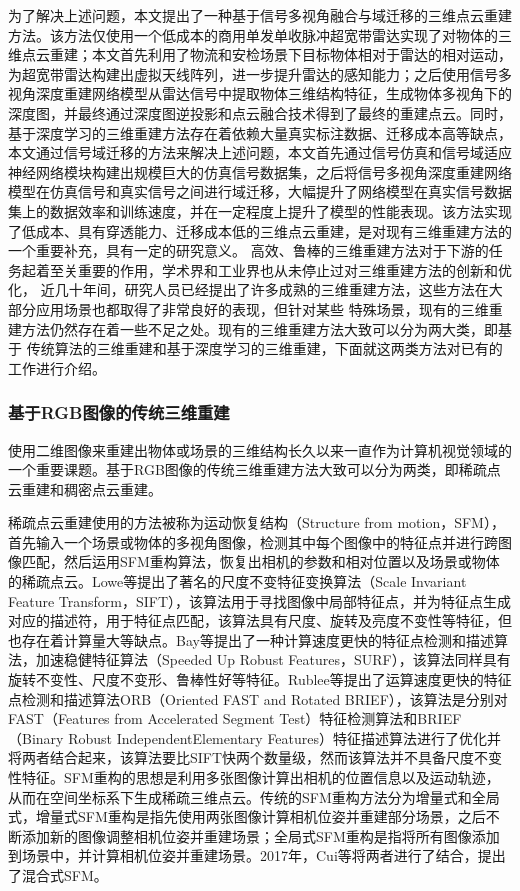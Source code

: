 为了解决上述问题，本文提出了一种基于信号多视角融合与域迁移的三维点云重建方法。该方法仅使用一个低成本的商用单发单收脉冲超宽带雷达实现了对物体的三维点云重建；本文首先利用了物流和安检场景下目标物体相对于雷达的相对运动，为超宽带雷达构建出虚拟天线阵列，进一步提升雷达的感知能力；之后使用信号多视角深度重建网络模型从雷达信号中提取物体三维结构特征，生成物体多视角下的深度图，并最终通过深度图逆投影和点云融合技术得到了最终的重建点云。同时，基于深度学习的三维重建方法存在着依赖大量真实标注数据、迁移成本高等缺点，本文通过信号域迁移的方法来解决上述问题，本文首先通过信号仿真和信号域适应神经网络模块构建出规模巨大的仿真信号数据集，之后将信号多视角深度重建网络模型在仿真信号和真实信号之间进行域迁移，大幅提升了网络模型在真实信号数据集上的数据效率和训练速度，并在一定程度上提升了模型的性能表现。该方法实现了低成本、具有穿透能力、迁移成本低的三维点云重建，是对现有三维重建方法的一个重要补充，具有一定的研究意义。
高效、鲁棒的三维重建方法对于下游的任务起着至关重要的作用，学术界和工业界也从未停止过对三维重建方法的创新和优化，
近几十年间，研究人员已经提出了许多成熟的三维重建方法，这些方法在大部分应用场景也都取得了非常良好的表现，但针对某些
特殊场景，现有的三维重建方法仍然存在着一些不足之处。现有的三维重建方法大致可以分为两大类，即基于
传统算法的三维重建和基于深度学习的三维重建，下面就这两类方法对已有的工作进行介绍。
\subsubsection{基于RGB图像的传统三维重建}
使用二维图像来重建出物体或场景的三维结构长久以来一直作为计算机视觉领域的一个重要课题。基于RGB图像的传统三维重建方法大致可以分为两类，即稀疏点云重建和稠密点云重建。

稀疏点云重建使用的方法被称为运动恢复结构（Structure from motion，SFM），首先输入一个场景或物体的多视角图像，检测其中每个图像中的特征点并进行跨图像匹配，然后运用SFM重构算法，恢复出相机的参数和相对位置以及场景或物体的稀疏点云。Lowe等\cite{lowe1999object}提出了著名的尺度不变特征变换算法（Scale Invariant Feature Transform，SIFT），该算法用于寻找图像中局部特征点，并为特征点生成对应的描述符，用于特征点匹配，该算法具有尺度、旋转及亮度不变性等特征，但也存在着计算量大等缺点。Bay等\cite{bay2008speeded}提出了一种计算速度更快的特征点检测和描述算法，加速稳健特征算法（Speeded Up Robust Features，SURF），该算法同样具有旋转不变性、尺度不变形、鲁棒性好等特征。Rublee等提出了运算速度更快的特征点检测和描述算法ORB（Oriented FAST and Rotated BRIEF）\cite{rublee2011orb}，该算法是分别对FAST（Features from  Accelerated Segment Test）\cite{viswanathan2009features}特征检测算法和BRIEF（Binary Robust IndependentElementary Features）\cite{calonder2010brief}特征描述算法进行了优化并将两者结合起来，该算法要比SIFT快两个数量级，然而该算法并不具备尺度不变性特征。SFM重构的思想是利用多张图像计算出相机的位置信息以及运动轨迹，从而在空间坐标系下生成稀疏三维点云。传统的SFM重构方法分为增量式\cite{wu2013towards}和全局式\cite{cui2015efficient}，增量式SFM重构是指先使用两张图像计算相机位姿并重建部分场景，之后不断添加新的图像调整相机位姿并重建场景；全局式SFM重构是指将所有图像添加到场景中，并计算相机位姿并重建场景。2017年，Cui等\cite{cui2017hsfm}将两者进行了结合，提出了混合式SFM。

